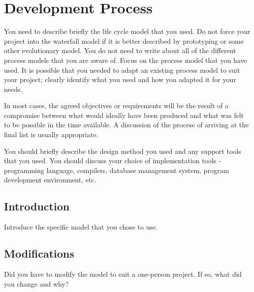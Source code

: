 \chapter{Development Process}

You need to describe briefly the life cycle model that you used. Do not force your project into the waterfall model if it is better described by prototyping or some other evolutionary model. You do not need to write about all of the different process models that you are aware of. Focus on the process model that you have used. It is possible that you needed to adapt an existing process model to suit your project; clearly identify what you used and how you adapted it for your needs.

In most cases, the agreed objectives or requirements will be the result of a compromise between what would ideally have been produced and what was felt to be possible in the time available. A discussion of the process of arriving at the final list is usually appropriate.

You should briefly describe the design method you used and any support tools that you used. You should discuss your choice of implementation tools - programming language, compilers, database management system, program development environment, etc.

\section{Introduction}
Introduce the specific model that you chose to use. 

\section{Modifications}
Did you have to modify the model to suit a one-person project. If so, what did you change and why? 
